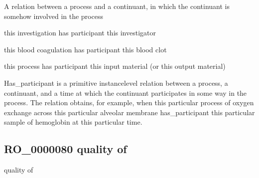 \documentclass[letterpaper,10pt,english]{sphinxmanual}
\begin{document}
\begin{sphinxShadowBox}

\sphinxAtStartPar
{}
\end{sphinxShadowBox}

\begin{sphinxShadowBox}

\sphinxAtStartPar
A relation between a process and a continuant, in which the continuant is somehow involved in the process
\end{sphinxShadowBox}

\begin{sphinxShadowBox}

\sphinxAtStartPar
this investigation has participant this investigator

\sphinxAtStartPar
this blood coagulation has participant this blood clot

\sphinxAtStartPar
this process has participant this input material (or this output material)
\end{sphinxShadowBox}

\begin{sphinxShadowBox}

\sphinxAtStartPar
Has\_participant is a primitive instance\sphinxhyphen{}level relation between a process, a continuant, and a time at which the continuant participates in some way in the process. The relation obtains, for example, when this particular process of oxygen exchange across this particular alveolar membrane has\_participant this particular sample of hemoglobin at this particular time.
\end{sphinxShadowBox}

\begin{sphinxShadowBox}

\sphinxAtStartPar
{}
\end{sphinxShadowBox}
\begin{quote}

\ignorespaces \end{quote}


\subsection{RO\_0000080 \sphinxhyphen{} quality of}
\label{\detokenize{doc-RO_0000080:ro-0000080-quality-of}}\label{\detokenize{doc-RO_0000080:index-0}}\label{\detokenize{doc-RO_0000080::doc}}
\begin{sphinxShadowBox}

\sphinxAtStartPar
quality of
\end{sphinxShadowBox}
\end{document}
